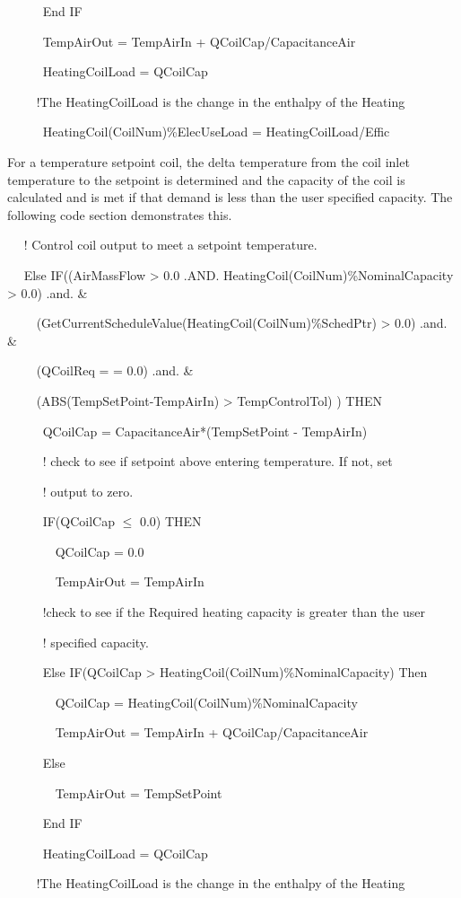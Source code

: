 ~~~~~ End IF

~~~~~ TempAirOut = TempAirIn + QCoilCap/CapacitanceAir

~~~~~ HeatingCoilLoad = QCoilCap

~~~~ !The HeatingCoilLoad is the change in the enthalpy of the Heating

~~~~~ HeatingCoil(CoilNum)\%ElecUseLoad = HeatingCoilLoad/Effic

For a temperature setpoint coil, the delta temperature from the coil inlet temperature to the setpoint is determined and the capacity of the coil is calculated and is met if that demand is less than the user specified capacity.  The following code section demonstrates this.

~~ ! Control coil output to meet a setpoint temperature.

~~ Else IF((AirMassFlow \textgreater{} 0.0 .AND. HeatingCoil(CoilNum)\%NominalCapacity \textgreater{} 0.0) .and. \&

~~~~ (GetCurrentScheduleValue(HeatingCoil(CoilNum)\%SchedPtr) \textgreater{} 0.0) .and. \&

~~~~ (QCoilReq = = 0.0) .and. \&

~~~~ (ABS(TempSetPoint-TempAirIn) \textgreater{} TempControlTol) ) THEN

~~~~~ QCoilCap = CapacitanceAir*(TempSetPoint - TempAirIn)

~~~~~ ! check to see if setpoint above entering temperature. If not, set

~~~~~ ! output to zero.

~~~~~ IF(QCoilCap \(\leq\) 0.0) THEN

~~~~~~~ QCoilCap = 0.0

~~~~~~~ TempAirOut = TempAirIn

~~~~~ !check to see if the Required heating capacity is greater than the user

~~~~~ ! specified capacity.

~~~~~ Else IF(QCoilCap \textgreater{} HeatingCoil(CoilNum)\%NominalCapacity) Then

~~~~~~~ QCoilCap = HeatingCoil(CoilNum)\%NominalCapacity

~~~~~~~ TempAirOut = TempAirIn + QCoilCap/CapacitanceAir

~~~~~ Else

~~~~~~~ TempAirOut = TempSetPoint

~~~~~ End IF

~~~~~ HeatingCoilLoad = QCoilCap

~~~~ !The HeatingCoilLoad is the change in the enthalpy of the Heating

